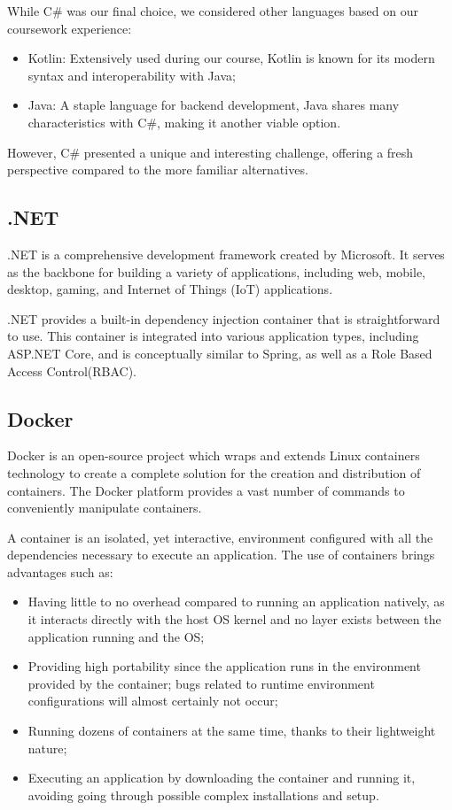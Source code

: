 While C\# was our final choice, we considered other languages based on our coursework experience:
\begin{itemize}
	\item Kotlin: Extensively used during our course, Kotlin is known for its modern syntax and interoperability with Java;
	\item Java: A staple language for backend development, Java shares many characteristics with C\#, making it another viable option.
\end{itemize}

However, C\# presented a unique and interesting challenge, offering a fresh perspective compared to the more familiar alternatives.

\subsection{.NET}
.NET is a comprehensive development framework created by Microsoft. It serves as the backbone for building a variety of applications, including web, mobile, desktop, gaming, and Internet of Things (IoT) applications.

.NET provides a built-in dependency injection container that is straightforward to use. This container is integrated into various application types, including ASP.NET Core, and is conceptually similar to Spring, as well as a Role Based Access Control(RBAC).

\subsection{Docker}

Docker is an open-source project which wraps and extends Linux containers technology to create a complete solution for the creation and distribution of containers.
The Docker platform provides a vast number of commands to conveniently manipulate
containers.

A container is an isolated, yet interactive, environment configured with all the dependencies necessary to execute an application. The use of containers brings advantages
such as:
\begin{itemize}
	\item Having little to no overhead compared to running an application natively, as it interacts directly with the host OS kernel and no layer exists between the application running and the OS;
	\item Providing high portability since the application runs in the environment provided by the container; bugs related to runtime environment configurations will almost certainly not occur;
	\item Running dozens of containers at the same time, thanks to their lightweight nature;
	\item Executing an application by downloading the container and running it, avoiding going through possible complex installations and setup.
\end{itemize}


